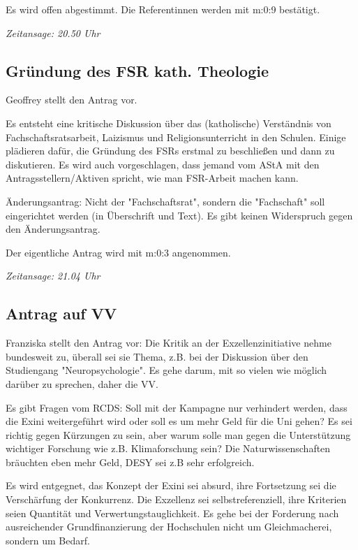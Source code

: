 \documentclass[ngerman,headheight=70pt]{scrartcl}
\begin{document}
    Es wird offen abgestimmt. Die Referentinnen werden mit m:0:9 bestätigt.

    \textit{Zeitansage: 20.50 Uhr}

    \subsection{Gründung des FSR kath. Theologie}

    Geoffrey stellt den Antrag vor.

    Es entsteht eine kritische Diskussion über das (katholische) Verständnis von
    Fachschaftsratsarbeit, Laizismus und Religionsunterricht in den Schulen.
    Einige plädieren dafür, die Gründung des FSRs erstmal zu beschließen und
    dann zu diskutieren. Es wird auch vorgeschlagen, dass jemand vom AStA mit
    den Antragsstellern/Aktiven spricht, wie man FSR-Arbeit machen kann.

    Änderungsantrag: Nicht der "Fachschaftsrat", sondern die "Fachschaft" soll
    eingerichtet werden (in Überschrift und Text). Es gibt keinen Widerspruch
    gegen den Änderungsantrag.

    Der eigentliche Antrag wird mit m:0:3 angenommen.

    \textit{Zeitansage: 21.04 Uhr}

    \subsection{Antrag auf VV}

    Franziska stellt den Antrag vor: Die Kritik an der Exzellenzinitiative nehme
    bundesweit zu, überall sei sie Thema, z.B. bei der Diskussion über den
    Studiengang "Neuropsychologie". Es gehe darum, mit so vielen wie möglich
    darüber zu sprechen, daher die VV.

    Es gibt Fragen vom RCDS: Soll mit der Kampagne nur verhindert werden, dass
    die Exini weitergeführt wird oder soll es um mehr Geld für die Uni gehen?
    Es sei richtig gegen Kürzungen zu sein, aber warum solle man gegen die
    Unterstützung wichtiger Forschung wie z.B. Klimaforschung sein? Die
    Naturwissenschaften bräuchten eben mehr Geld, DESY sei z.B sehr erfolgreich.

    Es wird entgegnet, das Konzept der Exini sei absurd, ihre Fortsetzung sei
    die Verschärfung der Konkurrenz. Die Exzellenz sei selbstreferenziell, ihre
    Kriterien seien Quantität und Verwertungstauglichkeit. Es gehe bei der
    Forderung nach ausreichender Grundfinanzierung der Hochschulen nicht um
    Gleichmacherei, sondern um Bedarf.
\end{document}

